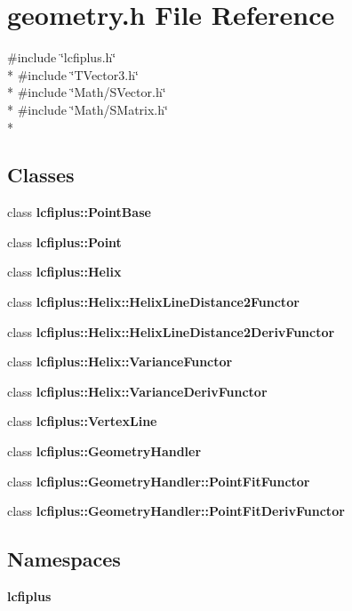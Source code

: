 \section{geometry.\-h File Reference}
\label{geometry_8h}
{\ttfamily \#include \char`\"{}lcfiplus.\-h\char`\"{}}\\*
{\ttfamily \#include \char`\"{}T\-Vector3.\-h\char`\"{}}\\*
{\ttfamily \#include \char`\"{}Math/\-S\-Vector.\-h\char`\"{}}\\*
{\ttfamily \#include \char`\"{}Math/\-S\-Matrix.\-h\char`\"{}}\\*
\subsection*{Classes}
\begin{DoxyCompactItemize}
\item 
class {\bf lcfiplus\-::\-Point\-Base}
\item 
class {\bf lcfiplus\-::\-Point}
\item 
class {\bf lcfiplus\-::\-Helix}
\item 
class {\bf lcfiplus\-::\-Helix\-::\-Helix\-Line\-Distance2\-Functor}
\item 
class {\bf lcfiplus\-::\-Helix\-::\-Helix\-Line\-Distance2\-Deriv\-Functor}
\item 
class {\bf lcfiplus\-::\-Helix\-::\-Variance\-Functor}
\item 
class {\bf lcfiplus\-::\-Helix\-::\-Variance\-Deriv\-Functor}
\item 
class {\bf lcfiplus\-::\-Vertex\-Line}
\item 
class {\bf lcfiplus\-::\-Geometry\-Handler}
\item 
class {\bf lcfiplus\-::\-Geometry\-Handler\-::\-Point\-Fit\-Functor}
\item 
class {\bf lcfiplus\-::\-Geometry\-Handler\-::\-Point\-Fit\-Deriv\-Functor}
\end{DoxyCompactItemize}
\subsection*{Namespaces}
\begin{DoxyCompactItemize}
\item 
{\bf lcfiplus}
\end{DoxyCompactItemize}
